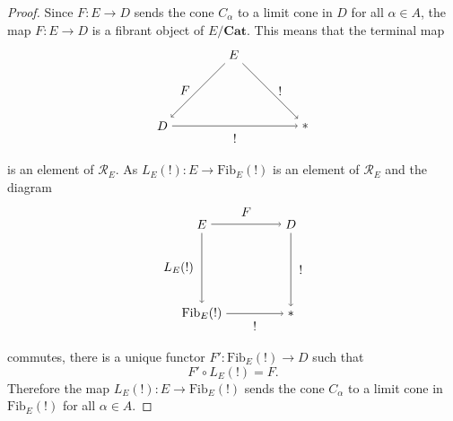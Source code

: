 \documentclass[10pt,a4paper]{amsart}
\begin{document}
\begin{proof}
Since $F:E\to D$ sends the cone $C_\alpha$ to a limit cone in $D$ for all $\alpha\in A$, the map $F:E\to D$ is a fibrant object of $E/\mathbf{Cat}$. This means that the terminal map
\[
\begin{tikzpicture}[node distance=2cm]
	\node (A){$E$};
	\node (B)[below of=A]{};
	\node (C)[left of=B]{$D$};
	\node (D)[node distance=4cm,right of=C]{$*$};
	\draw[->](A) to node[left=3]{$F$} (C);
	\draw[->](A) to node[right=3]{$!$}(D);
	\draw[->](C) to node[below=3]{$!$}(D);
\end{tikzpicture}
\]
is an element of $\mathcal{R}_E$. As $L_E(!):E\to \mathrm{Fib}_E(!)$ is an element of $\mathcal{R}_E$ and the diagram
\[
\begin{tikzpicture}[node distance=2.5cm,auto]
		\node (A) {$E$};
		\node (B)[right of=A] {$D$};
		\node(C)[below of=A] {$\mathrm{Fib}_E(!)$};
		\node (D)[right of=C] {$*$};
		\draw[->] (A) to node[above=3] {$F$}(B);
		\draw[->,swap] (A) to node[left=3]{$L_E(!)$}(C);
		\draw[->] (B) to node[right=3]{$!$}(D);
		\draw[->,swap] (C) to node[below=3] {$!$}(D);
	\end{tikzpicture}
\]
commutes, there is a unique functor $F':\mathrm{Fib}_E(!)\to D$ such that
	\[
	F'\circ L_E(!)=F.
	\]
    Therefore the map $L_E(!):E\to \mathrm{Fib}_E(!)$ sends the cone $C_\alpha$
	to a limit cone in $\mathrm{Fib}_E(!)$ for all $\alpha\in A.$
\end{proof}
\end{document}
